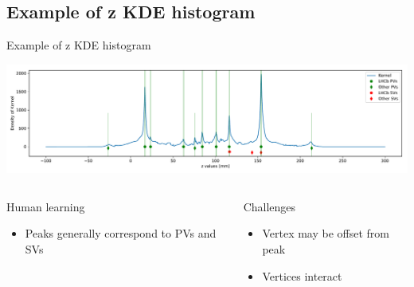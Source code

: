 \subsection{Example of z KDE histogram}
\begin{frame}{Example of z KDE histogram}
\begin{center}
    \includegraphics[width=\textwidth, trim=50 30 50 30]{images/kernel_and_pvs.pdf}
\end{center}
\begin{columns}[t]
    \begin{block}{Human learning}
    \begin{itemize}
        \item Peaks generally correspond to PVs and SVs
    \end{itemize}
    \end{block}

    \begin{block}{Challenges}
    \begin{itemize}
        \item Vertex may be offset from peak
        \item Vertices interact
    \end{itemize}
    \end{block}
\end{columns}
\end{frame}



